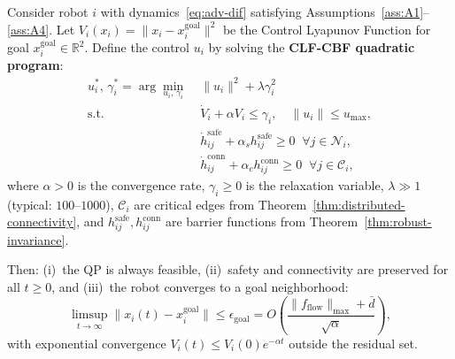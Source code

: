 \begin{theorem}
\label{thm:clf-goal-convergence}
Consider robot $i$ with dynamics~\eqref{eq:adv-dif} satisfying Assumptions~\ref{ass:A1}--\ref{ass:A4}. Let $V_i(x_i)=\|x_i-x_i^{\mathrm{goal}}\|^2$ be the Control Lyapunov Function for goal $x_i^{\mathrm{goal}}\in\mathbb{R}^2$. Define the control $u_i$ by solving the \textbf{CLF-CBF quadratic program}:
\begin{equation}
\begin{aligned}
u_i^*,\,\gamma_i^* = \arg\min_{u_i,\,\gamma_i} \; & \|u_i\|^2 + \lambda\gamma_i^2 \\
\text{s.t.} \; & \dot{V}_i + \alpha V_i \le \gamma_i, \quad \|u_i\| \le u_{\max}, \\
& \dot{h}_{ij}^{\mathrm{safe}} + \alpha_s h_{ij}^{\mathrm{safe}} \ge 0 \;\; \forall j\in\mathcal{N}_i, \\
& \dot{h}_{ij}^{\mathrm{conn}} + \alpha_c h_{ij}^{\mathrm{conn}} \ge 0 \;\; \forall j\in\mathcal{C}_i,
\end{aligned}
\label{eq:clf-cbf-qp}
\end{equation}
where $\alpha>0$ is the convergence rate, $\gamma_i\ge 0$ is the relaxation variable, $\lambda\gg 1$ (typical: $100$--$1000$), $\mathcal{C}_i$ are critical edges from Theorem~\ref{thm:distributed-connectivity}, and $h_{ij}^{\mathrm{safe}},h_{ij}^{\mathrm{conn}}$ are barrier functions from Theorem~\ref{thm:robust-invariance}.

Then: (i)~the QP is always feasible, (ii)~safety and connectivity are preserved for all $t\ge 0$, and (iii)~the robot converges to a goal neighborhood:
\begin{equation}
\limsup_{t\to\infty} \|x_i(t)-x_i^{\mathrm{goal}}\| \le \epsilon_{\mathrm{goal}} = O\left(\frac{\|f_{\mathrm{flow}}\|_{\max}+\bar{d}}{\sqrt{\alpha}}\right),
\label{eq:residual-set}
\end{equation}
with exponential convergence $V_i(t)\le V_i(0)e^{-\alpha t}$ outside the residual set.
\end{theorem}

